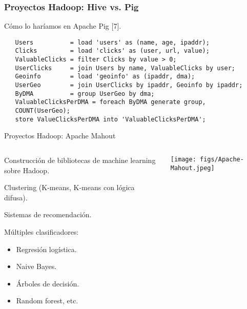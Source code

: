 \begin{frame}[fragile]
  \frametitle{Proyectos Hadoop: Hive vs. Pig}
    \begin{wideitemize}
      \item Cómo lo haríamos en Apache Pig [7].
    \end{wideitemize}
  \fontsize{8pt}{12pt}\selectfont
  \begin{verbatim}
   Users          = load 'users' as (name, age, ipaddr);
   Clicks         = load 'clicks' as (user, url, value);
   ValuableClicks = filter Clicks by value > 0;
   UserClicks     = join Users by name, ValuableClicks by user;
   Geoinfo        = load 'geoinfo' as (ipaddr, dma);
   UserGeo        = join UserClicks by ipaddr, Geoinfo by ipaddr;
   ByDMA          = group UserGeo by dma;
   ValuableClicksPerDMA = foreach ByDMA generate group, 
   COUNT(UserGeo);
   store ValueClicksPerDMA into 'ValuableClicksPerDMA';
  \end{verbatim}

\end{frame}


\begin{frame}{Proyectos Hadoop: Apache Mahout}
 \begin{columns}[T]
    \begin{column}{.8\textwidth}
     \begin{wideitemize}
      \item Construcción de bibliotecas de machine learning sobre Hadoop.
      \item Clustering (K-means, K-means con lógica difusa).
      \item Sistemas de recomendación.
      \item Múltiples clasificadores:
      \begin{itemize}
       \item Regresión logística.
       \item Naive Bayes.
       \item Árboles de decisión.
       \item Random forest, etc. 
      \end{itemize}

    \end{wideitemize}
    \end{column}
    \begin{column}{.2\textwidth}
    \vspace*{.7cm}
    \texttt{[image: figs/Apache-Mahout.jpeg]}
    \end{column}
  \end{columns}

\end{frame}

